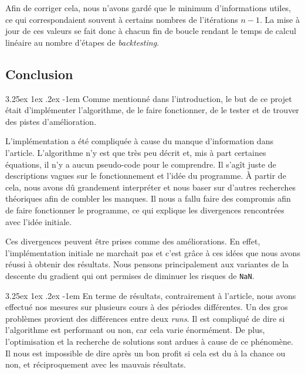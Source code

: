\documentclass[a4paper, 11pt]{article}
\makeatletter
\renewcommand\paragraph{\@startsection{paragraph}{5}{\z@}%
  {3.25ex \@plus1ex \@minus.2ex}%
  {-1em}%
  {\normalfont\normalsize\bfseries}}
\makeatother
\begin{document}
Afin de corriger cela, nous n'avons gardé que le minimum d'informations utiles, ce qui correspondaient souvent à certains nombres de l'itérations $n-1$. La mise à jour de ces valeurs se fait donc à chacun fin de boucle rendant le temps de calcul linéaire au nombre d'étapes de \textit{backtesting}.
 
\subsection{Conclusion}
\paragraph{}
Comme mentionné dans l'introduction, le but de ce projet était d'implémenter l'algorithme, de le faire fonctionner, de le tester et de trouver des pistes
d'amélioration.

L'implémentation a été compliquée à cause du manque d'information dans l'article. L'algorithme n'y est que très peu décrit et, mis à part certaines 
équations, il n'y a aucun pseudo-code pour le comprendre. Il s'agît juste de descriptions vagues sur le fonctionnement et l'idée du programme. À partir de
cela, nous avons dû grandement interpréter et nous baser sur d'autres recherches théoriques afin de combler les manques. Il nous a fallu faire des compromis
afin de faire fonctionner le programme, ce qui explique les divergences rencontrées avec l'idée initiale.

Ces divergences peuvent être prises comme des améliorations. En effet, l'implémentation initiale ne marchait pas et c'est grâce à ces idées que nous avons
réussi à obtenir des résultats. Nous pensons principalement aux variantes de la descente du gradient qui ont permises de diminuer les risques de
\texttt{NaN}.

\paragraph{}
En terme de résultats, contrairement à l'article, nous avons effectué nos mesures sur plusieurs cours à des périodes différentes. Un des gros problèmes
provient des différences entre deux \textit{runs}. Il est compliqué de dire si l'algorithme est performant ou non, car cela varie énormément. De plus,
l'optimisation et la recherche de solutions sont ardues à cause de ce phénomène. Il nous est impossible de dire après un bon profit si cela est du à la
chance ou non, et réciproquement avec les mauvais résultats.
\end{document}
